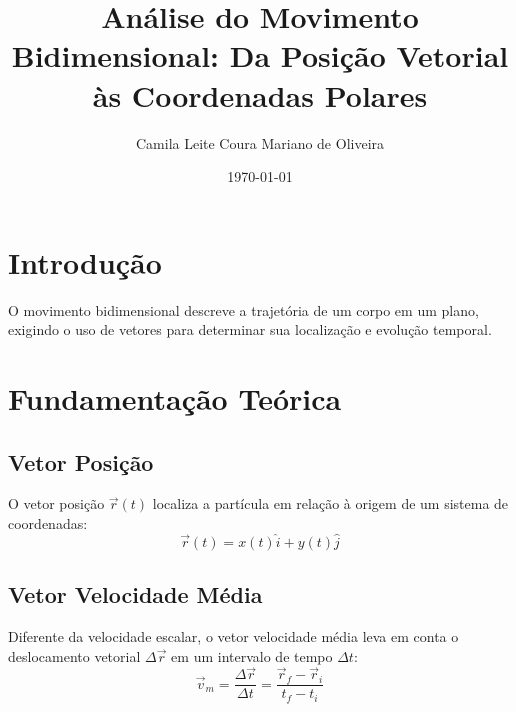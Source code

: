 \documentclass[11pt,a4paper]{article}
\title{Análise do Movimento Bidimensional: Da Posição Vetorial às Coordenadas Polares}
\author{Camila Leite Coura Mariano de Oliveira}
\date{\today}
\begin{document}
\maketitle

\section{Introdução}
O movimento bidimensional descreve a trajetória de um corpo em um plano, exigindo o uso de vetores para determinar sua localização e evolução temporal.



\section{Fundamentação Teórica}

\subsection{Vetor Posição}
O vetor posição $\vec{r}(t)$ localiza a partícula em relação à origem de um sistema de coordenadas:
$$\vec{r}(t) = x(t)\hat{i} + y(t)\hat{j}$$

\subsection{Vetor Velocidade Média}
Diferente da velocidade escalar, o vetor velocidade média leva em conta o deslocamento vetorial $\Delta \vec{r}$ em um intervalo de tempo $\Delta t$:
$$\vec{v}_{m} = \frac{\Delta \vec{r}}{\Delta t} = \frac{\vec{r}_f - \vec{r}_i}{t_f - t_i}$$
\end{document}
